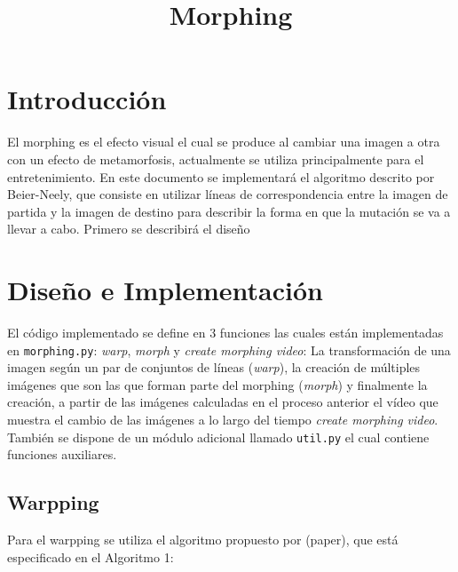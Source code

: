 \documentclass[conference]{IEEEtran}
\begin{document}
\title{Morphing}
\author{
}


\maketitle

\begin{abstract}
	
\end{abstract}
 

\section*{Introducción} %
	El morphing es el efecto visual el cual se produce al cambiar una imagen a otra con un efecto de metamorfosis, actualmente se utiliza principalmente para el entretenimiento. En este documento se implementará el algoritmo descrito por Beier-Neely, que consiste en utilizar líneas de correspondencia entre la imagen de partida y la imagen de destino para describir la forma en que la mutación se va a llevar a cabo. Primero se describirá el diseño 
	
	
\section*{Diseño e Implementación}
	El código implementado se define en 3 funciones las cuales están implementadas en \texttt{morphing.py}: \textit{warp}, \textit{morph} y \textit{create morphing video}: La transformación de una imagen según un par de conjuntos de líneas (\textit{warp}), la creación de múltiples imágenes que son las que forman parte del morphing (\textit{morph}) y finalmente la creación, a partir de las imágenes calculadas en el proceso anterior el vídeo que muestra el cambio de las imágenes a lo largo del tiempo \textit{create morphing video}. También se dispone de un módulo adicional llamado \texttt{util.py} el cual contiene funciones auxiliares.
	
	\subsection*{Warpping}
		Para el warpping se utiliza el algoritmo propuesto por (paper), que está especificado en el Algoritmo 1:
\end{document}
